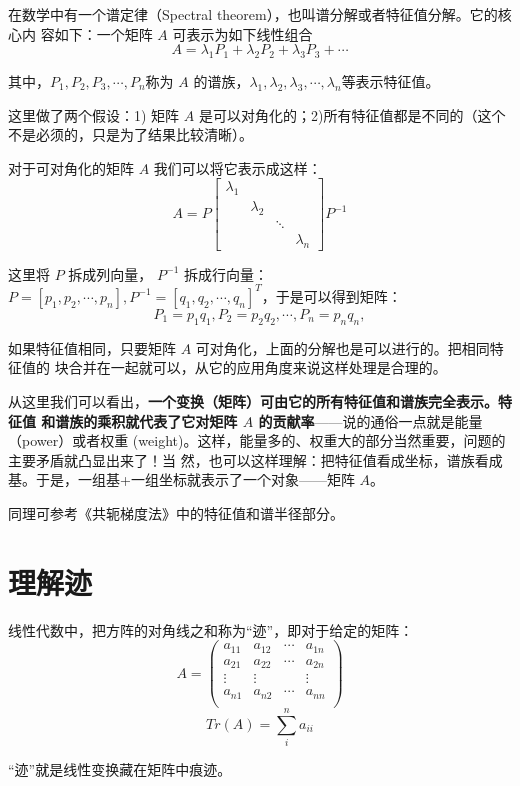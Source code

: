 \documentclass[12pt]{article}
\begin{document}
在数学中有一个谱定律（Spectral theorem），也叫谱分解或者特征值分解。它的核心内 容如下：一个矩阵 $A$ 可表示为如下线性组合
$$
A = \lambda_1 P_1 + \lambda_2 P_2 + \lambda_3 P_3 +  \cdots
$$

其中，$P_1, P_2, P_3, \cdots, P_n $称为 $A$ 的谱族，$\lambda_1, \lambda_2, \lambda_3, \cdots, \lambda_n$等表示特征值。

这里做了两个假设：1) 矩阵 $A$ 是可以对角化的；2)所有特征值都是不同的（这个不是必须的，只是为了结果比较清晰）。

对于可对角化的矩阵 $A$ 我们可以将它表示成这样：
$$
A = P
\begin{bmatrix}
\lambda_1 & & & \\
& \lambda_2 & & \\
& & \ddots & \\
& & & \lambda_n 
\end{bmatrix}
P^{-1}
$$

这里将 $P$ 拆成列向量， $P^{-1}$ 拆成行向量：$P = [p_1, p_2, \cdots, p_n], P^{-1} = [q_1, q_2, \cdots, q_n]^T$，于是可以得到矩阵：
$$
P_1 = p_1q_1, P_2 = p_2q_2, \cdots, P_n = p_nq_n, 
$$

如果特征值相同，只要矩阵 $A$ 可对角化，上面的分解也是可以进行的。把相同特征值的 块合并在一起就可以，从它的应用角度来说这样处理是合理的。

从这里我们可以看出，\textbf{一个变换（矩阵）可由它的所有特征值和谱族完全表示。特征值 和谱族的乘积就代表了它对矩阵 $A$ 的贡献率}——说的通俗一点就是能量（power）或者权重 (weight)。这样，能量多的、权重大的部分当然重要，问题的主要矛盾就凸显出来了！当 然，也可以这样理解：把特征值看成坐标，谱族看成基。于是，一组基+一组坐标就表示了一个对象——矩阵 $A$。

同理可参考《共轭梯度法》中的特征值和谱半径部分。

\section{理解迹\cite{How_To_Understand_Trace}}
线性代数中，把方阵的对角线之和称为“迹”，即对于给定的矩阵：
$$
A = \begin{pmatrix}
a_{11} & a_{12} & \cdots & a_{1n} \\
a_{21} & a_{22} & \cdots & a_{2n} \\
\vdots & \vdots & & \vdots \\
a_{n1} & a_{n2} & \cdots & a_{nn} \\
\end{pmatrix}
$$
$$
Tr(A) = \sum_i^na_{ii}
$$

“迹”就是线性变换藏在矩阵中痕迹。
\end{document}
